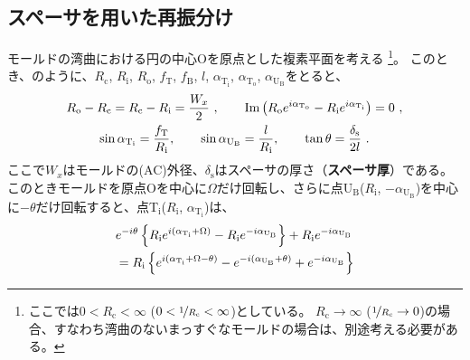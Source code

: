 \subsection{スペーサを用いた再振分け}
モールドの湾曲における円の中心Oを原点とした複素平面を考える
\footnote{ここでは$0 < R_\mathrm c < \infty$ ($0 < \nicefrac1{R_\mathrm c} < \infty$)としている。
$R_\mathrm c \to \infty$ ($\nicefrac1{R_\mathrm c} \to 0$)の場合、すなわち湾曲のないまっすぐなモールドの場合は、別途考える必要がある。}。
このとき、のように、$R_\mathrm c$, $R_\mathrm i$, $R_\mathrm o$, $f_\mathrm T$, $f_\mathrm B$, $l$, $\alpha_{\mathrm T_\mathrm i}$, $\alpha_{\mathrm T_\mathrm o}$, $\alpha_{\mathrm U_\mathrm B}$をとると、
\begin{subequations}
\begin{gather}
  \label{eq:constraintUpoint1}
  R_\mathrm o - R_\mathrm c = R_\mathrm c - R_\mathrm i = \frac{W_x}2~, \qquad
  \operatorname{Im}\left(R_\mathrm oe^{i\alpha_{\mathrm T_\mathrm o}} - R_\mathrm ie^{i\alpha_{\mathrm T_\mathrm i}}\right)
  = 0~,\\
  \label{eq:constraintUpoint2}
  \sin\alpha_{\mathrm T_\mathrm i} = \frac{f_\mathrm T}{R_\mathrm i}, \qquad
  \sin\alpha_{\mathrm U_\mathrm B} = \frac l{R_\mathrm i}, \qquad
  \tan\theta = \frac{\delta_\mathrm s}{2l}~.
\end{gather}
\end{subequations}
ここで$W_x$はモールドの(AC)外径、$\delta_\mathrm s$はスペーサの厚さ（\textbf{スペーサ厚}）である。
このときモールドを原点Oを中心に$\Omega$だけ回転し、さらに点U$_\mathrm B$($R_\mathrm i$, $-\alpha_{\mathrm U_\mathrm B}$)を中心に$-\theta$だけ回転すると、点T$_\mathrm i$($R_\mathrm i$, $\alpha_{\mathrm T_\mathrm i}$)は、
\begin{align}
  \notag
  & e^{-i\theta}\left\{R_\mathrm ie^{i(\alpha_{\mathrm T_\mathrm i} + \Omega)} - R_\mathrm ie^{-i\alpha_{\mathrm U_\mathrm B}}\right\}
    +R_\mathrm ie^{-i\alpha_{\mathrm U_\mathrm B}}\\
  &= R_\mathrm i
     \left\{
       e^{i(\alpha_{\mathrm T_\mathrm i} + \Omega - \theta)} - e^{-i(\alpha_{\mathrm U_\mathrm B} + \theta)} + e^{-i\alpha_{\mathrm U_\mathrm B}}
     \right\}
  \label{eq:afterftUpoint}
\end{align}
